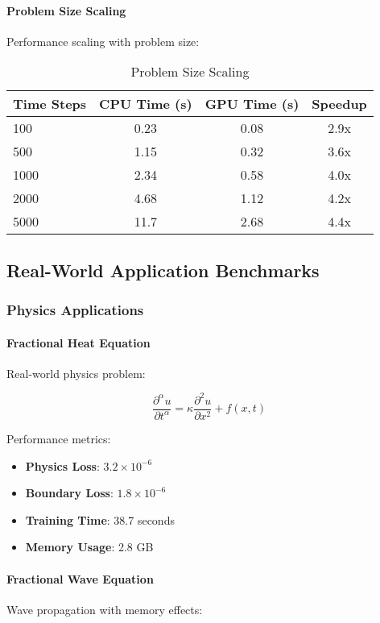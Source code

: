 \paragraph{Problem Size Scaling}
Performance scaling with problem size:

\begin{table}[h]
\centering
\caption{Problem Size Scaling}
\begin{tabular}{lccc}
\toprule
Time Steps & CPU Time (s) & GPU Time (s) & Speedup \\
\midrule
100 & 0.23 & 0.08 & 2.9x \\
500 & 1.15 & 0.32 & 3.6x \\
1000 & 2.34 & 0.58 & 4.0x \\
2000 & 4.68 & 1.12 & 4.2x \\
5000 & 11.7 & 2.68 & 4.4x \\
\bottomrule
\end{tabular}
\end{table}

\subsection{Real-World Application Benchmarks}

\subsubsection{Physics Applications}

\paragraph{Fractional Heat Equation}
Real-world physics problem:

\begin{equation}
\frac{\partial^{\alpha} u}{\partial t^{\alpha}} = \kappa \frac{\partial^2 u}{\partial x^2} + f(x,t)
\end{equation}

Performance metrics:
\begin{itemize}
    \item \textbf{Physics Loss}: $3.2 \times 10^{-6}$
    \item \textbf{Boundary Loss}: $1.8 \times 10^{-6}$
    \item \textbf{Training Time}: 38.7 seconds
    \item \textbf{Memory Usage}: 2.8 GB
\end{itemize}

\paragraph{Fractional Wave Equation}
Wave propagation with memory effects:

